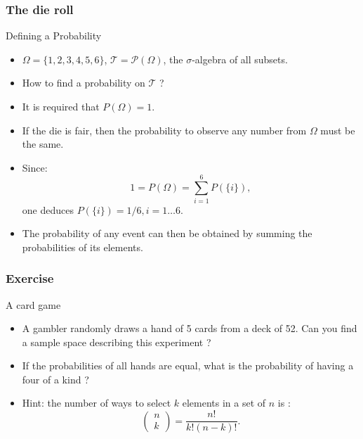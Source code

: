 \begin{frame}
    \frametitle{The die roll}
\begin{block}{Defining a Probability}
    \begin{itemize}
        \item<+-> $\Omega = \{1,2,3,4,5,6\}$, $\mathcal{T} = \mathcal{P}\left( \Omega \right)$, 
        the $\sigma$-algebra of all subsets. 
        \item<+-> How to find a probability on $\mathcal{T}$ ?
        \item<+-> It is required that $P\left( \Omega \right) = 1.$
        \item<+-> If the die is fair, then the probability to observe any number
        from $\Omega$ must be the same.
        \item<+-> Since:
        \begin{equation}
            1 = P\left( \Omega \right) = \sum_{i=1}^6 P\left( \{i\} \right),
        \end{equation}
        one deduces $P\left( \{i\} \right) = 1/6, i=1 \dots 6.$
        \item<+-> The probability of any event can then be obtained by summing the probabilities
        of its elements. 
    \end{itemize}
\end{block}
\end{frame}
\begin{frame}
    \frametitle{Exercise}
\begin{block}{A card game}
   \begin{itemize}
    \item<+-> A gambler randomly draws a hand of 5 cards from a deck of 52. Can you find 
    a sample space describing this experiment ?
    \item<+-> If the probabilities of all hands are equal, what is the probability of having a four of a kind ?
    \item<+-> Hint: the number of ways to select $k$ elements in a set of $n$
    is :
    \begin{equation}
        \begin{pmatrix}
            n \\ k
        \end{pmatrix} = \frac{n!}{k!\left( n-k \right)!}.
    \end{equation}
   \end{itemize} 
\end{block}
\end{frame}
